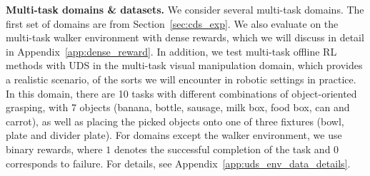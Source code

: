 \noindent \textbf{Multi-task domains \& datasets.} We consider several multi-task domains. The first set of domains are from Section~\ref{sec:cds_exp}. We also evaluate on the multi-task walker environment with dense rewards, which we will discuss in detail in Appendix~\ref{app:dense_reward}.
In addition, we test multi-task offline RL methods with UDS in the multi-task visual manipulation domain, which provides a realistic scenario, of the sorts we will encounter in robotic settings in practice. In this domain, there are 10 tasks with different combinations of object-oriented grasping, with 7 objects (banana, bottle, sausage, milk box, food box, can and carrot), as well as placing the picked objects onto one of three fixtures (bowl, plate and divider plate). For domains except the walker environment, we use binary rewards, where $1$ denotes the successful completion of the task and $0$ corresponds to failure. For details, see Appendix~\ref{app:uds_env_data_details}.

